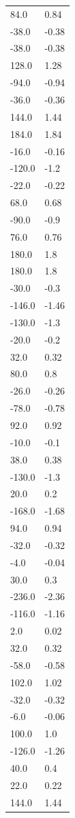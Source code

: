 \begin{longtable}{ll}
84.0 & 0.84 \\
-38.0 & -0.38 \\
-38.0 & -0.38 \\
128.0 & 1.28 \\
-94.0 & -0.94 \\
-36.0 & -0.36 \\
144.0 & 1.44 \\
184.0 & 1.84 \\
-16.0 & -0.16 \\
-120.0 & -1.2 \\
-22.0 & -0.22 \\
68.0 & 0.68 \\
-90.0 & -0.9 \\
76.0 & 0.76 \\
180.0 & 1.8 \\
180.0 & 1.8 \\
-30.0 & -0.3 \\
-146.0 & -1.46 \\
-130.0 & -1.3 \\
-20.0 & -0.2 \\
32.0 & 0.32 \\
80.0 & 0.8 \\
-26.0 & -0.26 \\
-78.0 & -0.78 \\
92.0 & 0.92 \\
-10.0 & -0.1 \\
38.0 & 0.38 \\
-130.0 & -1.3 \\
20.0 & 0.2 \\
-168.0 & -1.68 \\
94.0 & 0.94 \\
-32.0 & -0.32 \\
-4.0 & -0.04 \\
30.0 & 0.3 \\
-236.0 & -2.36 \\
-116.0 & -1.16 \\
2.0 & 0.02 \\
32.0 & 0.32 \\
-58.0 & -0.58 \\
102.0 & 1.02 \\
-32.0 & -0.32 \\
-6.0 & -0.06 \\
100.0 & 1.0 \\
-126.0 & -1.26 \\
40.0 & 0.4 \\
22.0 & 0.22 \\
144.0 & 1.44 \\

\end{longtable}
